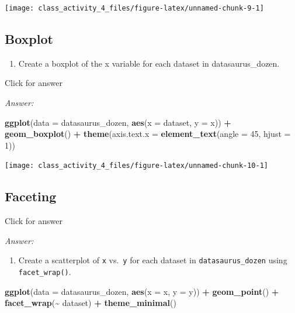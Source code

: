 \documentclass[
]{book}
\newenvironment{Shaded}{\begin{snugshade}}{\end{snugshade}}
\newcommand{\AttributeTok}[1]{\textcolor[rgb]{0.13,0.29,0.53}{#1}}
\newcommand{\DecValTok}[1]{\textcolor[rgb]{0.00,0.00,0.81}{#1}}
\newcommand{\FunctionTok}[1]{\textcolor[rgb]{0.13,0.29,0.53}{\textbf{#1}}}
\newcommand{\NormalTok}[1]{#1}
\newcommand{\SpecialCharTok}[1]{\textcolor[rgb]{0.81,0.36,0.00}{\textbf{#1}}}
\providecommand{\tightlist}{%
  \setlength{\itemsep}{0pt}\setlength{\parskip}{0pt}}
\begin{document}
\texttt{[image: class\_activity\_4\_files/figure-latex/unnamed-chunk-9-1]}

\hypertarget{boxplot}{%
\subsection{Boxplot}\label{boxplot}}

\begin{enumerate}
\def\labelenumi{\alph{enumi}.}
\tightlist
\item
  Create a boxplot of the x variable for each dataset in datasaurus\_dozen.
\end{enumerate}

Click for answer

\emph{Answer:}

\begin{Shaded}
\begin{Highlighting}[]
\FunctionTok{ggplot}\NormalTok{(}\AttributeTok{data =}\NormalTok{ datasaurus\_dozen, }\FunctionTok{aes}\NormalTok{(}\AttributeTok{x =}\NormalTok{ dataset, }\AttributeTok{y =}\NormalTok{ x)) }\SpecialCharTok{+}
  \FunctionTok{geom\_boxplot}\NormalTok{() }\SpecialCharTok{+}
  \FunctionTok{theme}\NormalTok{(}\AttributeTok{axis.text.x =} \FunctionTok{element\_text}\NormalTok{(}\AttributeTok{angle =} \DecValTok{45}\NormalTok{, }\AttributeTok{hjust =} \DecValTok{1}\NormalTok{))}
\end{Highlighting}
\end{Shaded}

\texttt{[image: class\_activity\_4\_files/figure-latex/unnamed-chunk-10-1]}

\hypertarget{faceting}{%
\subsection{Faceting}\label{faceting}}

Click for answer

\emph{Answer:}

\begin{enumerate}
\def\labelenumi{\alph{enumi}.}
\tightlist
\item
  Create a scatterplot of \texttt{x} vs.~\texttt{y} for each dataset in \texttt{datasaurus\_dozen} using \texttt{facet\_wrap()}.
\end{enumerate}

\begin{Shaded}
\begin{Highlighting}[]
\FunctionTok{ggplot}\NormalTok{(}\AttributeTok{data =}\NormalTok{ datasaurus\_dozen, }\FunctionTok{aes}\NormalTok{(}\AttributeTok{x =}\NormalTok{ x, }\AttributeTok{y =}\NormalTok{ y)) }\SpecialCharTok{+}
  \FunctionTok{geom\_point}\NormalTok{() }\SpecialCharTok{+}
  \FunctionTok{facet\_wrap}\NormalTok{(}\SpecialCharTok{\textasciitilde{}}\NormalTok{ dataset) }\SpecialCharTok{+}
  \FunctionTok{theme\_minimal}\NormalTok{()}
\end{Highlighting}
\end{Shaded}
\end{document}
